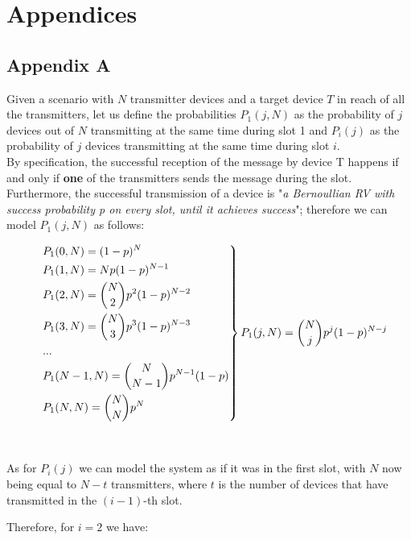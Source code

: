 \chapter{Appendices}

\section*{Appendix A}
Given a scenario with $N$ transmitter devices and a target device $T$ in reach of all the transmitters, let us define the probabilities $P_{1}(j, N)$ as the probability of $j$ devices out of $N$ transmitting at the same time during slot 1 and $P_{i}(j)$ as the probability of $j$ devices transmitting at the same time during slot $i$.\\
By specification, the successful reception of the message by device T happens if and only if \textbf{one} of the transmitters sends the message during the slot.
Furthermore, the successful transmission of a device is "\textit{a Bernoullian RV with success probability \emph{p} on every slot, until it achieves success}"; therefore we can model $P_{1}(j, N)$ as 
follows:

\[
\begin{drcases}
    &P_{1}(0, N) = (1-p)^{N} \\
    &P_{1}(1, N) = N p(1-p)^{N-1}\\
    &P_{1}(2, N) = {N\choose2}p^{2}(1-p)^{N-2}\\
	&P_{1}(3, N) = {N\choose3}p^{3}(1-p)^{N-3}\\
	&...\\
	&P_{1}(N-1, N) = {N\choose N-1}p^{N-1}(1-p)\\
	&P_{1}(N, N) = {N\choose N}p^{N}\\
\end{drcases}
P_{1}(j, N) = {N\choose j} p^{j} (1-p)^{N-j}
\]
\\
\\
As for $P_{i}(j)$ we can model the system as if it was in the first slot, with $N$ now being equal to $N-t$ transmitters, where $t$ is the number of devices that have transmitted in the $(i-1)$-th slot.

Therefore, for $i=2$ we have:

